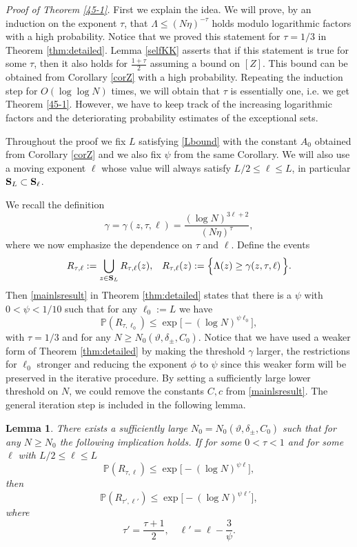 \documentclass[draft]{article}
\newcommand{\ttau}{\vartheta}
\newcommand{\be}{\begin{equation}}
\newcommand{\ee}{\end{equation}}
\renewcommand{\P}{{\mathbb P}}
\newcommand{\bS}{ {\bf  S}}
\newtheorem{lemma}[theorem]{Lemma}
\numberwithin{equation}{section}
\numberwithin{theorem}{section}
\numberwithin{definition}{section}
\numberwithin{remark}{section}
\begin{document}
{\it Proof of Theorem \ref{45-1}.}  First we explain the idea.
We will prove, by  an induction on the exponent $\tau$,  
that $\Lambda\le (N\eta)^{-\tau}$ holds modulo logarithmic factors
with a high probability. Notice that we proved this statement
for $\tau =1/3$ in Theorem \ref{thm:detailed}.
Lemma \ref{selfKK} asserts that if this statement
is true for some $\tau$, then it also holds for $\frac{1+\tau}{2}$ assuming
a bound on $[Z]$. This bound can be obtained from Corollary \ref{corZ}
with a high probability.
Repeating the induction step for $O(\log \log N)$ times, we will obtain 
that $\tau$ is essentially one, i.e. we get Theorem \ref{45-1}.
However, we have to keep track of the increasing logarithmic factors
and the deteriorating probability estimates of the exceptional sets.


Throughout the proof we fix $L$ satisfying \eqref{Lbound}
with the constant  $A_0$ obtained from Corollary \ref{corZ} and
we also fix $\psi$ from the same Corollary.
We will also use a moving exponent $\ell$ 
whose value will always
satisfy $L/2\le \ell \le  L$, in particular $\bS_L\subset \bS_\ell$.


We recall the definition
\be
   \gamma=\gamma(z, \tau, \ell)=\frac{(\log N)^{3 \ell +2}  }{(N\eta)^{\tau}},
\label{gamdef}
\ee
where we now emphasize the dependence on $\tau$ and $\ell$. 
Define the events 
\be\label{y1}
  R_{\tau, \ell}  := \bigcup_{z\in \bS_L}  R_{\tau,\ell}(z), \;\;\; 
R_{\tau,\ell} (z) :=  \Big\{ \Lambda (z) \geq \gamma(z,\tau,\ell) \, \Big\}.
\ee
Then \eqref{mainlsresult} in
 Theorem \ref{thm:detailed} states  that there is a $\psi$ with $0<\psi<1/10$
such that for any $\ell_0:=L$ we have
\be\label{y1-0}
   \P\left( R_{\tau, \ell_0} \right)\leq \exp{\big[-(\log N)^{\psi \ell_0 } \big]},
 \ee
with   $ \tau = 1/3$ and for any $N\ge N_0(\ttau, \delta_\pm, C_0)$.
 Notice that we have used  a weaker form of  Theorem \ref{thm:detailed}
 by making the threshold $\gamma$  larger, the 
restrictions for $\ell_0$ stronger 
 and  reducing the exponent $\phi$ to $\psi$
since  this weaker form will be preserved in  the iterative procedure.   
By setting a sufficiently large lower threshold on $N$, we could remove the
constants $C, c$ from \eqref{mainlsresult}.
The general iteration step is included in the following lemma.


\begin{lemma} \label{y4} There exists a sufficiently large $N_0=N_0(\ttau,\delta_\pm, C_0)$
such that for any $N\ge N_0$ the following implication holds.
If for some $0< \tau < 1$ and for 
some  $\ell$ with $L/2\le \ell\le L$
\be\label{y1-1}
   \P\left( R_{\tau, \ell} \right)\leq \exp \big[-(\log N)^{\psi  \ell } \big] ,
\ee
 then 
\be\label{y2}
   \P\left( R_{\tau', \ell'} \right)\leq \exp{\big[-(\log N)^{  \psi  \ell'} \big]},
\ee
where 
\be\label{y3}
\tau' = \frac {\tau + 1} 2 , \quad \ell' = \ell - \frac 3 { \psi}.
\ee
\end{lemma}
\end{document}
